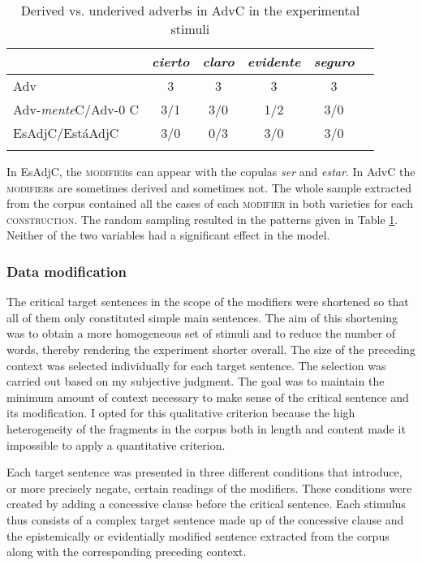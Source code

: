 \begin{table}
	\begin{tabular}{lccccc}
	\lsptoprule
		& \textit{cierto} & \textit{claro} & \textit{evidente} & \textit{seguro}\\\midrule
		Adv & 3 & 3 &3 &3 \\
		Adv-\textit{mente}C/Adv-0 C& 3/1 & 3/0 & 1/2 & 3/0 \\ 
		EsAdjC/EstáAdjC & 3/0 & 0/3 & 3/0 & 3/0\\
	\lspbottomrule
	\end{tabular}
	\caption{Derived vs. underived adverbs in AdvC in the experimental stimuli \label{tab:spall}}
\end{table}


In EsAdjC, the \textsc{modifier}s can appear with the copulas \textit{ser} and \textit{estar}. In AdvC the \textsc{modifier}s are sometimes derived and sometimes  not. The whole sample extracted from the corpus contained all the cases of each \textsc{modifier} in both varieties for each \textsc{construction}.  The random sampling resulted in the patterns given in Table \ref{tab:spall}. Neither of the two variables had a significant effect in the model.

\subsubsection{Data modification}
 The critical target sentences in the scope of the modifiers were shortened so that all  of them only  constituted  simple main sentences. The aim of this shortening was to obtain a more homogeneous set of stimuli and to reduce the number of words, thereby  rendering the experiment shorter overall. The size of the preceding context was selected individually for each target sentence. The selection was carried out based on my subjective judgment. The goal was to maintain the minimum amount of context necessary to make sense of the critical sentence and its modification. I opted for this qualitative criterion because the high heterogeneity of the fragments in the corpus both in length and content  made it impossible to apply a quantitative criterion.

Each target sentence was presented in three different conditions that introduce, or more precisely negate, certain readings of the modifiers. These conditions were created by adding a concessive clause before the critical sentence. 
Each stimulus thus consists of a complex target sentence made up of the concessive clause and the epistemically or evidentially modified sentence extracted from the corpus along with the corresponding preceding context.

